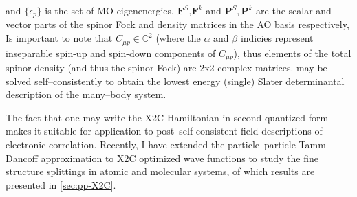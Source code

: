 \documentclass[12pt]{article}
\newcommand*\vc[1]{\boldsymbol{#1}}
\begin{document}
and $\{\epsilon_p\}$ is the set of MO
eigenenergies. $\vc{F}^S$,$\vc{F}^k$ and $\vc{P}^S,\vc{P}^k$ are the scalar and
vector parts of the spinor Fock and density matrices in the AO basis
respectively, 
Is important to note that $C_{\mu p} \in \mathbb{C}^2$ (where the $\alpha$ and
$\beta$ indicies represent inseparable spin-up and spin-down components of
$C_{\mu p}$), thus elements of the total spinor density (and thus the spinor
Fock) are 2x2 complex matrices.   may be solved
self--consistently to obtain the lowest energy (single) Slater determinantal
description of the many--body system.

The fact that one may write the X2C Hamiltonian in second quantized form makes it
suitable for application to post--self consistent field descriptions of
electronic correlation. Recently, I have extended the particle--particle
Tamm--Dancoff approximation to X2C optimized wave functions to study the fine
structure splittings in atomic and molecular systems, of which results are
presented in \cref{sec:pp-X2C}.


\linespread{1.0}

\end{document}

